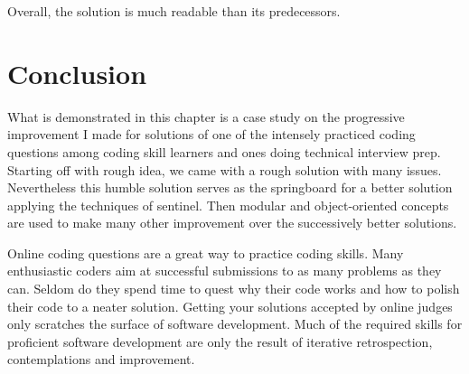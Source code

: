 Overall, the solution  is much readable than its predecessors.

\section{Conclusion}\label{sec:minWindowSubstringConclusion}

What is demonstrated in this chapter is a case study on the progressive improvement I made for
solutions of one of the intensely practiced coding questions among coding skill learners and ones
doing technical interview prep.
Starting off with rough idea, we came with a rough solution with many issues.
Nevertheless this humble solution serves as the springboard for a better solution applying the
techniques of sentinel.
Then modular and object-oriented concepts are used to make many other improvement over the
successively better solutions.

Online coding questions are a great way to practice coding skills.
Many enthusiastic coders aim at successful submissions to as many problems as they can.
Seldom do they spend time to quest why their code works and how to polish their code to a neater
solution.
Getting your solutions accepted by online judges only scratches the surface of software development.
Much of the required skills for proficient software development are only the result of
iterative retrospection, contemplations and improvement.
